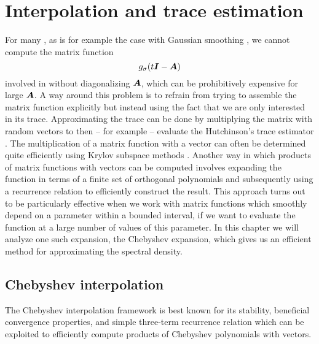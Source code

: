 \chapter{Interpolation and trace estimation}
\label{chp:2-chebyshev}

For many , as is for example the case with Gaussian smoothing
, we cannot compute the matrix function
\begin{equation}
    g_{\sigma}(t\boldsymbol{I} - \boldsymbol{A})
    \label{equ:2-chebyshev-matrix-function}
\end{equation}
involved in  without
diagonalizing $\boldsymbol{A}$, which can be prohibitively expensive for large
$\boldsymbol{A}$. A way around this problem is to refrain from trying to assemble the
matrix function explicitly but instead using the fact that we are only interested
in its trace. Approximating the trace can be done by multiplying the matrix
with random vectors to then -- for example -- evaluate the Hutchinson's trace estimator \cite{hutchinson1990trace}.
The multiplication of a matrix function with a vector can
often be determined quite efficiently using Krylov subspace methods
\cite[chapter~13.2]{higham2008functions}. Another way in which products of matrix
functions with vectors can be computed involves
expanding the function in terms of a finite set of orthogonal polynomials
and subsequently using a recurrence relation to efficiently construct the result.
This approach turns out to be particularly effective when we work with matrix
functions which smoothly depend on a parameter within a bounded interval, if we
want to evaluate the function at a large number of values of this parameter.
In this chapter we will analyze one such expansion, the Chebyshev expansion,
which gives us an efficient method for approximating the spectral density.


\section{Chebyshev interpolation}
\label{sec:2-chebyshev-interpolation}


The Chebyshev interpolation framework is best known for its stability, beneficial
convergence properties, and simple three-term recurrence relation
 which can
be exploited to efficiently compute products of Chebyshev polynomials with
vectors.\\

